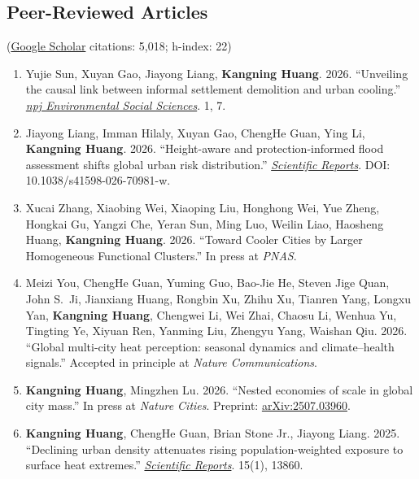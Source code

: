 \documentclass[11pt,letterpaper]{article}
\begin{document}
\subsection{Peer-Reviewed Articles}
{\small(\href{https://scholar.google.com/citations?user=s_domssAAAAJ&hl=en}{Google Scholar} citations: 5,018; h-index: 22)}

\begin{enumerate}
  \item Yujie Sun, Xuyan Gao, Jiayong Liang, \textbf{Kangning Huang}. 2026. ``Unveiling the causal link between informal settlement demolition and urban cooling.'' \href{https://doi.org/10.1038/s44432-026-00009-1}{\textit{npj Environmental Social Sciences}}. 1, 7.

  \item Jiayong Liang, Imman Hilaly, Xuyan Gao, ChengHe Guan, Ying Li, \textbf{Kangning Huang}. 2026. ``Height-aware and protection-informed flood assessment shifts global urban risk distribution.'' \href{https://www.nature.com/articles/s41598-026-70981-w}{\textit{Scientific Reports}}. DOI: 10.1038/s41598-026-70981-w.

  \item Xucai Zhang, Xiaobing Wei, Xiaoping Liu, Honghong Wei, Yue Zheng, Hongkai Gu, Yangzi Che, Yeran Sun, Ming Luo, Weilin Liao, Haosheng Huang, \textbf{Kangning Huang}. 2026. ``Toward Cooler Cities by Larger Homogeneous Functional Clusters.'' In press at \textit{PNAS}.
  \item Meizi You, ChengHe Guan, Yuming Guo, Bao-Jie He, Steven Jige Quan, John S.\ Ji, Jianxiang Huang, Rongbin Xu, Zhihu Xu, Tianren Yang, Longxu Yan, \textbf{Kangning Huang}, Chengwei Li, Wei Zhai, Chaosu Li, Wenhua Yu, Tingting Ye, Xiyuan Ren, Yanming Liu, Zhengyu Yang, Waishan Qiu. 2026. ``Global multi-city heat perception: seasonal dynamics and climate--health signals.'' Accepted in principle at \textit{Nature Communications}.

  \item \textbf{Kangning Huang}, Mingzhen Lu. 2026. ``Nested economies of scale in global city mass.'' In press at \textit{Nature Cities}. Preprint: \href{https://arxiv.org/abs/2507.03960}{arXiv:2507.03960}.

  \item \textbf{Kangning Huang}, ChengHe Guan, Brian Stone Jr., Jiayong Liang. 2025. ``Declining urban density attenuates rising population-weighted exposure to surface heat extremes.'' \href{https://www.nature.com/articles/s41598-025-96045-z}{\textit{Scientific Reports}}. 15(1), 13860.


\end{enumerate}
\end{document}
